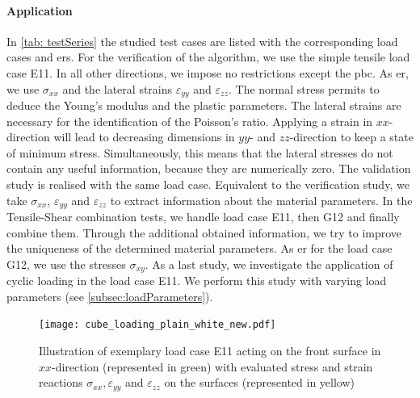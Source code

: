 \paragraph{Application}
In \autoref{tab: testSeries} the studied test cases are listed with the corresponding load cases and \acrlong{er}s.
For the verification of the algorithm, we use the simple tensile load case E11.
In all other directions, we impose no restrictions except the \acrshort{pbc}. As \acrlong{er}, we use $\sigma_{xx}$ and the lateral strains $\varepsilon_{yy}$ and $\varepsilon_{zz}$. The normal stress permits to deduce the Young's modulus and the plastic parameters. The lateral strains are necessary for the identification of the Poisson's ratio. Applying a strain in $xx$-direction will lead to decreasing dimensions in $yy$- and $zz$-direction to keep a state of minimum stress. Simultaneously, this means that the lateral stresses do not contain any useful information, because they are numerically zero. 
The validation study is realised with the same load case. Equivalent to the verification study, we take $\sigma_{xx}$,  $\varepsilon_{yy}$ and $\varepsilon_{zz}$ to extract information about the material parameters. 
In the Tensile-Shear combination tests, we handle load case E11, then G12 and finally combine them. Through the additional obtained information, we try to improve the uniqueness of the determined material parameters. As \acrlong{er} for the load case G12, we use the stresses $\sigma_{xy}$.
As a last study, we investigate the application of cyclic loading in the load case E11. We perform this study with varying load parameters (see \autoref{subsec:loadParameters}). 
\begin{figure}[H]
    \centering
    \texttt{[image: cube\_loading\_plain\_white\_new.pdf]}
    \caption{Illustration of exemplary load case E11 acting on the front surface in $xx$-direction (represented in green) with evaluated stress and strain reactions $\sigma_{xx}, \varepsilon_{yy}$ and $\varepsilon_{zz}$ on the surfaces (represented in yellow)}
    \label{fig:evaluationMeasurements}
\end{figure}

